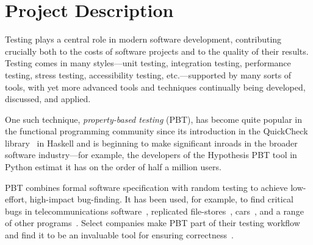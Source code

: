 \section{Project Description }

Testing plays a central role in modern software development,
contributing crucially both to the costs of software projects and to
the quality of their results.
%
Testing comes in many styles---unit testing, integration testing,
performance testing, stress testing, accessibility testing,
etc.---supported by many sorts of tools, with yet more advanced tools
and techniques continually being developed, discussed, and applied.

One such technique, {\em property-based testing} (PBT), has become
quite popular in the functional programming community since its
introduction in the QuickCheck library~\cite{ClaessenHughes00} in
Haskell and is beginning to make significant inroads in the broader
software industry---for example, the developers of the Hypothesis PBT
tool in Python estimat it has on the order of half a million
users\cite{ZacPersonalCommunication}.

PBT combines formal software specification with random
testing to achieve low-effort, high-impact bug-finding.
%
It has been used, for example, to find critical bugs in telecommunications
software~\cite{arts2006testing}, replicated
file-stores~\cite{hughes2014mysteries}, cars~\cite{arts2015testing}, and a range
of other programs~\cite{hughes2016experiences}.
%
Select companies make PBT part of
their testing workflow and find it to be an invaluable tool for ensuring
correctness~\cite{Bornholt2021}.

